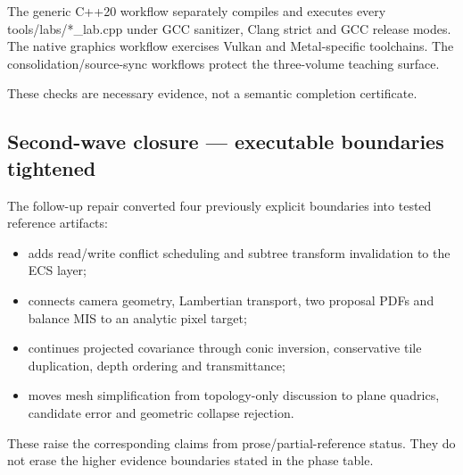 The generic C++20 workflow separately compiles and executes every tools/labs/*\_lab.cpp under GCC sanitizer, Clang strict and GCC release modes. The native graphics workflow exercises Vulkan and Metal-specific toolchains. The consolidation/source-sync workflows protect the three-volume teaching surface.

These checks are necessary evidence, not a semantic completion certificate.

\subsection{Second-wave closure --- executable boundaries tightened}\label{appendix-2358b21a702d-second-wave-closure-executable-boundaries-tightened}

\hypertarget{appendix-2358b21a702d-second-wave-closure-executable-boundaries-tightened}{}

The follow-up repair converted four previously explicit boundaries into tested reference artifacts:

\begin{itemize}
\tightlist
\item
   adds read/write conflict scheduling and subtree transform invalidation to the ECS layer;
\item
   connects camera geometry, Lambertian transport, two proposal PDFs and balance MIS to an analytic pixel target;
\item
   continues projected covariance through conic inversion, conservative tile duplication, depth ordering and transmittance;
\item
   moves mesh simplification from topology-only discussion to plane quadrics, candidate error and geometric collapse rejection.
\end{itemize}

These raise the corresponding claims from prose/partial-reference status. They do not erase the higher evidence boundaries stated in the phase table.

